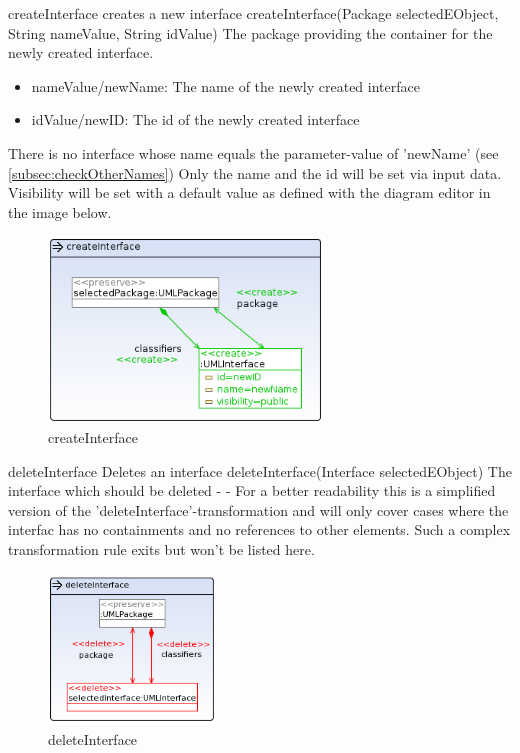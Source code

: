 \op
{createInterface}
{creates a new interface}
{createInterface(Package selectedEObject, String nameValue, String idValue)}
{The package providing the container for the newly created interface.}
{
\begin{itemize}
 \item nameValue/newName: The name of the newly created interface
 \item idValue/newID: The id of the newly created interface
\end{itemize}
}
{There is no interface whose name equals the parameter-value of 'newName' (see
\ref{subsec:checkOtherNames})}
{Only the name and the id will be set via input data. Visibility will be set
with a default value as defined with the diagram editor in the image below.}
\begin{figure}[H]
  \centering
  \includegraphics[width=0.65\textwidth]{pics/createInterface.png}
  \caption{createInterface}
  \label{createInterface}
\end{figure}
\op
{deleteInterface}
{Deletes an interface}
{deleteInterface(Interface selectedEObject)}
{The interface which should be deleted} {-}
{-}
{For a better readability this is a simplified version of the
'deleteInterface'-transformation and will only cover cases where the
interfac has no containments and no references to other elements. Such a
complex transformation rule exits but won't be listed here.}
\begin{figure}[H]
  \centering
  \includegraphics[width=0.4\textwidth]{pics/deleteInterface_emptyAndUnreferenced.png}
  \caption{deleteInterface}
  \label{deleteInterface}
\end{figure}

